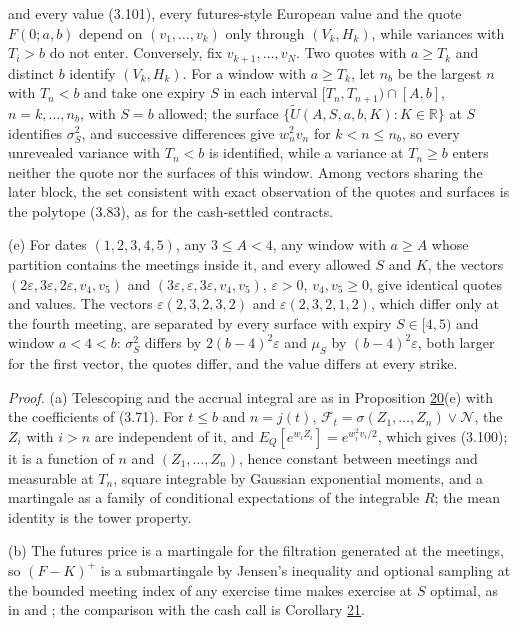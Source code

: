 \documentclass[11pt]{article}
\begin{document}
and every value (3.101), every futures-style European value and the quote \(F(0; a, b)\) depend on \((v_1, \dots, v_k)\) only through \((V_k, H_k)\), while variances with \(T_i > b\) do not enter. Conversely, fix \(v_{k+1}, \dots, v_N\). Two quotes with \(a \ge T_k\) and distinct \(b\) identify \((V_k, H_k)\). For a window with \(a \ge T_k\), let \(n_b\) be the largest \(n\) with \(T_n < b\) and take one expiry \(S\) in each interval \([T_n, T_{n+1}) \cap [A, b]\), \(n = k, \dots, n_b\), with \(S = b\) allowed; the surface \(\{\tilde U(A, S, a, b, K) : K \in \mathbb R\}\) at \(S\) identifies \(\sigma_S^2\), and successive differences give \(w_n^2 v_n\) for \(k < n \le n_b\), so every unrevealed variance with \(T_n < b\) is identified, while a variance at \(T_n \ge b\) enters neither the quote nor the surfaces of this window. Among vectors sharing the later block, the set consistent with exact observation of the quotes and surfaces is the polytope (3.83), as for the cash-settled contracts.

(e) For dates \((1, 2, 3, 4, 5)\), any \(3 \le A < 4\), any window with \(a \ge A\) whose partition contains the meetings inside it, and every allowed \(S\) and \(K\), the vectors \((2\varepsilon, 3\varepsilon, 2\varepsilon, v_4, v_5)\) and \((3\varepsilon, \varepsilon, 3\varepsilon, v_4, v_5)\), \(\varepsilon > 0\), \(v_4, v_5 \ge 0\), give identical quotes and values. The vectors \(\varepsilon(2, 3, 2, 3, 2)\) and \(\varepsilon(2, 3, 2, 1, 2)\), which differ only at the fourth meeting, are separated by every surface with expiry \(S \in [4, 5)\) and window \(a < 4 < b\): \(\sigma_S^2\) differs by \(2(b - 4)^2 \varepsilon\) and \(\mu_S\) by \((b - 4)^2 \varepsilon\), both larger for the first vector, the quotes differ, and the value differs at every strike.

\emph{Proof.} (a) Telescoping and the accrual integral are as in Proposition \hyperref[res:Proposition-20]{20}(e) with the coefficients of (3.71). For \(t \le b\) and \(n = j(t)\), \(\mathcal F_t = \sigma(Z_1, \dots, Z_n) \vee \mathcal N\), the \(Z_i\) with \(i > n\) are independent of it, and \(E_Q[e^{w_i Z_i}] = e^{w_i^2 v_i / 2}\), which gives (3.100); it is a function of \(n\) and \((Z_1, \dots, Z_n)\), hence constant between meetings and measurable at \(T_n\), square integrable by Gaussian exponential moments, and a martingale as a family of conditional expectations of the integrable \(R\); the mean identity is the tower property.

(b) The futures price is a martingale for the filtration generated at the meetings, so \((F - K)^+\) is a submartingale by Jensen's inequality and optional sampling at the bounded meeting index of any exercise time makes exercise at \(S\) optimal, as in \cite{lieu1990option} and \cite{chen1993pricing}; the comparison with the cash call is Corollary \hyperref[res:Corollary-21]{21}.
\end{document}
